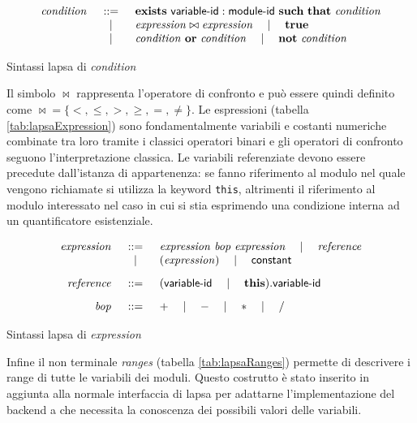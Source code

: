 \begin{table}[htbp!] %
$$
\begin{array}{rcl}
	\mathit{condition} &::=& \mathbf{exists} \mbox{ } {\sf variable}\textrm{-}{\sf id}:{\sf module}\textrm{-}{\sf id} \mbox{ } \mathbf{such}\mbox{ }\mathbf{that} \mbox{ } \mathit{condition} \\
		& \quad\mid\quad & \mathit{expression} \bowtie \mathit{expression} \quad\mid\quad \mathbf{true} \\
		& \quad\mid\quad & \mathit{condition} \mbox{ } \mathbf{or} \mbox{ } \mathit{condition} \quad\mid\quad \mathbf{not} \mbox{ } \mathit{condition}
		\\
\end{array}
$$
\caption{Sintassi \ac{lapsa} di \emph{condition}}
\label{tab:lapsaCondition}
\end{table}

Il simbolo $\bowtie$ rappresenta l'operatore di confronto e può essere quindi definito come $\bowtie = \{<,\leq,>,\geq, =, \neq\}$. Le espressioni (tabella \ref{tab:lapsaExpression}) sono fondamentalmente variabili e costanti numeriche combinate tra loro tramite i classici operatori binari e gli operatori di confronto seguono l'interpretazione classica.
Le variabili referenziate devono essere precedute dall'istanza di appartenenza: se fanno riferimento al modulo nel quale vengono richiamate si utilizza la keyword \texttt{this}, altrimenti il riferimento al modulo interessato nel caso in cui si stia esprimendo una condizione interna ad un quantificatore esistenziale.

\begin{table}[htbp!] %
$$
\begin{array}{rcl}
	\mathit{expression} &::=& \mathit{expression} \mbox{ } \mathit{bop} \mbox{ } \mathit{expression} \quad\mid\quad \mathit{reference} \\
	& \quad\mid\quad & (\mathit{expression}) \quad\mid\quad {\sf constant}
	\\[.3cm]
	\mathit{reference} &::=& ({\sf variable}\textrm{-}{\sf id} \quad\mid\quad \mathbf{this})\mathbf{.} {\sf variable}\textrm{-}{\sf id}
	\\[.3cm]
	\mathit{bop} &::=& + \quad\mid\quad - \quad\mid\quad * \quad\mid\quad \slash
	\\
\end{array}
$$
\caption{Sintassi \ac{lapsa} di \emph{expression}}
\label{tab:lapsaExpression}
\end{table}

Infine il non terminale \emph{ranges} (tabella \ref{tab:lapsaRanges}) permette di descrivere i range di tutte le variabili dei moduli. Questo costrutto è stato inserito in aggiunta alla normale interfaccia di \ac{lapsa} per adattarne l'implementazione del backend a \prism{} che necessita la conoscenza dei possibili valori delle variabili.


